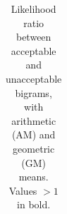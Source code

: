 \begin{table}[t]
\begin{small}
\begin{center}
\begin{tabular}{p{0.2cm}p{0.2cm}|p{0.6cm}p{0.6cm}||p{0.2cm}p{0.2cm}|p{0.99cm}p{0.8cm}}

      \hline
    \end{tabular}
  \end{center}    
  \end{small}
	\caption{\label{tab:phonotactics-results} Likelihood ratio between acceptable and unacceptable bigrams, with arithmetic (AM) and geometric (GM) means. Values $>1$ in bold.}
\end{table}
